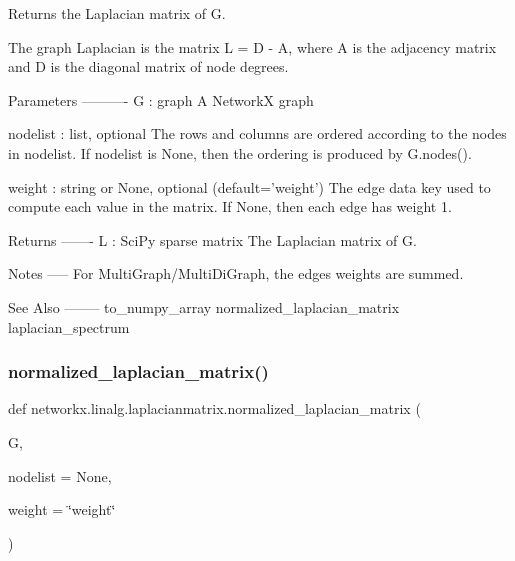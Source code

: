 \begin{DoxyVerb}Returns the Laplacian matrix of G.

The graph Laplacian is the matrix L = D - A, where
A is the adjacency matrix and D is the diagonal matrix of node degrees.

Parameters
----------
G : graph
   A NetworkX graph

nodelist : list, optional
   The rows and columns are ordered according to the nodes in nodelist.
   If nodelist is None, then the ordering is produced by G.nodes().

weight : string or None, optional (default='weight')
   The edge data key used to compute each value in the matrix.
   If None, then each edge has weight 1.

Returns
-------
L : SciPy sparse matrix
  The Laplacian matrix of G.

Notes
-----
For MultiGraph/MultiDiGraph, the edges weights are summed.

See Also
--------
to_numpy_array
normalized_laplacian_matrix
laplacian_spectrum
\end{DoxyVerb}
 \mbox{\label{namespacenetworkx_1_1linalg_1_1laplacianmatrix_ac26531196d011cf45284a537796ac537}} 
\subsubsection{\texorpdfstring{normalized\+\_\+laplacian\+\_\+matrix()}{normalized\_laplacian\_matrix()}}
{\footnotesize\ttfamily def networkx.\+linalg.\+laplacianmatrix.\+normalized\+\_\+laplacian\+\_\+matrix (\begin{DoxyParamCaption}\item[{}]{G,  }\item[{}]{nodelist = {\ttfamily None},  }\item[{}]{weight = {\ttfamily \char`\"{}weight\char`\"{}} }\end{DoxyParamCaption})}

